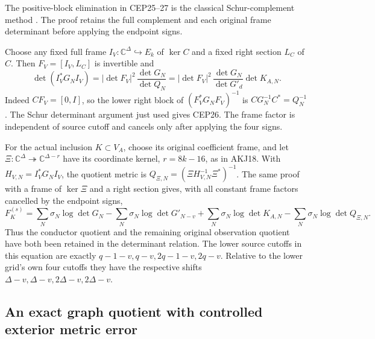 \documentclass[11pt,a4paper]{article}
\begin{document}
The positive-block elimination in CEP25--27 is the classical
Schur-complement method
\cite[\S2.1, (2.3)--(2.4)]{human:boyd1994}.
The proof retains the full complement and each original frame
determinant before applying the endpoint signs.

Choose any fixed full frame $I_V:\mathbb C^\Delta\hookrightarrow E_k$
of $\ker C$ and a fixed right section $L_C$ of $C$.
Then $F_V=[I_V,L_C]$ is invertible and
\[
 \det(I_V^*G_NI_V)
   =|\det F_V|^2\,\frac{\det G_N}{\det Q_N}
   =|\det F_V|^2\,\frac{\det G_N}{\det G'_d}\det K_{A,N}.
 \tag{CEP26}
\]
Indeed $CF_V=[0,I]$, so the lower right block of
$(F_V^*G_NF_V)^{-1}$ is $CG_N^{-1}C^*=Q_N^{-1}$.
The Schur determinant argument just used gives CEP26.
The frame factor is independent of source cutoff and cancels
only after applying the four signs.

For the actual inclusion $K\subset V_A$, choose its original
coefficient frame, and let $\Xi:\mathbb C^\Delta\twoheadrightarrow
\mathbb C^{\Delta-r}$ have its coordinate kernel, $r=8k-16$,
as in AKJ18. With $H_{V,N}=I_V^*G_NI_V$, the quotient metric is
$Q_{\Xi,N}=(\Xi H_{V,N}^{-1}\Xi^*)^{-1}$.
The same proof with a frame of $\ker\Xi$ and a right section gives,
with all constant frame factors cancelled by the endpoint signs,
\[
 F_K^{(s)}
 =\sum_N\sigma_N\log\det G_N
   -\sum_N\sigma_N\log\det G'_{N-v}
   +\sum_N\sigma_N\log\det K_{A,N}
   -\sum_N\sigma_N\log\det Q_{\Xi,N}.
 \tag{CEP27}
\]
Thus the conductor quotient and the remaining original observation
quotient have both been retained in the determinant relation.
The lower source cutoffs in this equation are exactly
$q-1-v,q-v,2q-1-v,2q-v$. Relative to the lower grid's own
four cutoffs they have the respective shifts
$\Delta-v,\Delta-v,2\Delta-v,2\Delta-v$.

\subsection{An exact graph quotient with controlled exterior metric error}
\end{document}
